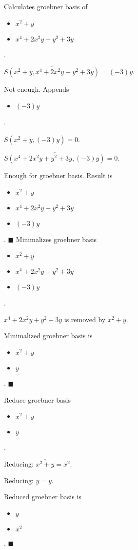 Calculates groebner basis of
\begin{itemize}
\item $x^{2}+y$
\item $x^{4}+2x^{2}y+y^{2}+3y$
\end{itemize}  .


$\overline{S(x^{2}+y, x^{4}+2x^{2}y+y^{2}+3y)} = (-3)y$.

Not enough.  Appends \begin{itemize}
\item $(-3)y$
\end{itemize}  .


$\overline{S(x^{2}+y, (-3)y)} = 0$.

$\overline{S(x^{4}+2x^{2}y+y^{2}+3y, (-3)y)} = 0$.

Enough for groebner basis.  Result is \begin{itemize}
\item $x^{2}+y$
\item $x^{4}+2x^{2}y+y^{2}+3y$
\item $(-3)y$
\end{itemize}  .
$\blacksquare{}$
Minimalizes groebner basis
\begin{itemize}
\item $x^{2}+y$
\item $x^{4}+2x^{2}y+y^{2}+3y$
\item $(-3)y$
\end{itemize}  .


$x^{4}+2x^{2}y+y^{2}+3y$ is removed by $x^{2}+y$.

Minimalized groebner basis is
\begin{itemize}
\item $x^{2}+y$
\item $y$
\end{itemize}  .
$\blacksquare{}$

Reduce groebner basis
\begin{itemize}
\item $x^{2}+y$
\item $y$
\end{itemize}  .


Reducing: $\overline{x^{2}+y} = x^{2}$.

Reducing: $\overline{y} = y$.

Reduced groebner basis is
\begin{itemize}
\item $y$
\item $x^{2}$
\end{itemize}  .
$\blacksquare{}$

